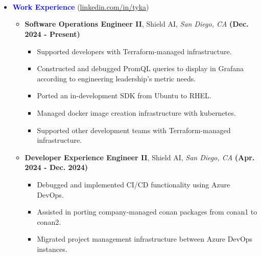 \documentclass[11pt]{article}
\begin{document}
\begin{flushleft}

    \makebox[\textwidth]{\LARGE \textbf{\textcolor{teal}{Tyler Kaminski}}}\\

\\
\\

\setlength{\parindent}{0.5in}

\begin{itemize}
    \item[] \Large \textcolor{blue}{\textbf{Work Experience}} (\href{https://linkedin.com/in/tyka}{linkedin.com/in/tyka}) \normalsize
        \begin{itemize}
            \item \textbf{Software Operations Engineer II}, Shield AI, \textit{San Diego, CA} \hfill{\textbf{(Dec. 2024 - Present)}}
                \begin{itemize}
                    \item Supported developers with Terraform-managed infrastructure.
                    \item Constructed and debugged PromQL queries to display in Grafana according to engineering leadership's metric needs.
                    \item Ported an in-development SDK from Ubuntu to RHEL.
                    \item Managed docker image creation infrastructure with kubernetes.
                    \item Supported other development teams with Terraform-managed infrastructure.
                \end{itemize}
            \item \textbf{Developer Experience Engineer II}, Shield AI, \textit{San Diego, CA} \hfill{\textbf{(Apr. 2024 - Dec. 2024)}}
                \begin{itemize}
                    \item Debugged and implemented CI/CD functionality using Azure DevOps.
                    \item Assisted in porting company-managed conan packages from conan1 to conan2.
                    \item Migrated project management infrastructure between Azure DevOps instances.
                \end{itemize}

\end{itemize}
\end{itemize}
\end{flushleft}
\end{document}
